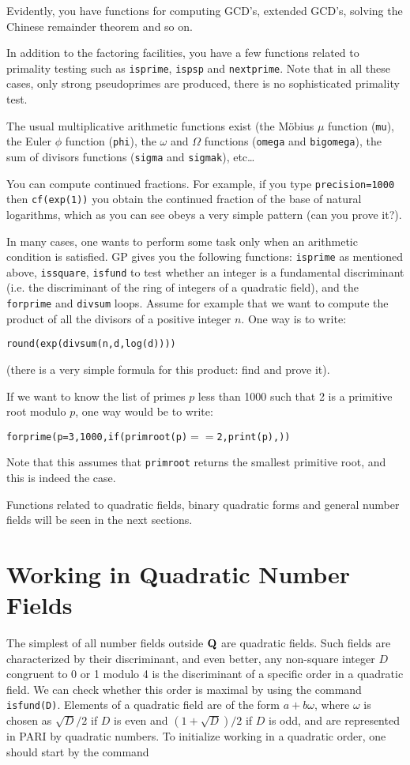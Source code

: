 Evidently, you have functions for computing GCD's, extended GCD's, solving
the Chinese remainder theorem and so on.

In addition to the factoring facilities, you have a few functions related to
primality testing such as {\tt isprime}, {\tt ispsp} and {\tt nextprime}.
Note that in all these cases, only strong pseudoprimes are produced, there
is no sophisticated primality test.

The usual multiplicative arithmetic functions exist (the M\"obius $\mu$ 
function ({\tt mu}), the Euler $\phi$ function ({\tt phi}), the $\omega$
and $\Omega$ functions ({\tt omega} and {\tt bigomega}), the sum of divisors
functions ({\tt sigma} and {\tt sigmak}), etc\dots

You can compute continued fractions. For example, if you type 
{\tt\bs precision=1000} then {\tt cf(exp(1))} you obtain the continued fraction
of the base of natural logarithms, which as you can see obeys a very simple
pattern (can you prove it?).

In many cases, one wants to perform some task only when an arithmetic condition
is satisfied. GP gives you the following functions: {\tt isprime} as mentioned
above, {\tt issquare}, {\tt isfund} to test whether an integer is a fundamental
discriminant (i.e. the discriminant of the ring of integers of a quadratic 
field), and the {\tt forprime} and {\tt divsum} loops. Assume for example that
we want to compute the product of all the divisors of a positive integer $n$.
One way is to write:

\centerline{\tt round(exp(divsum(n,d,log(d))))}

(there is a very simple formula for this product: find and prove it).

If we want to know the list of primes $p$ less than 1000 such that 2 is a
primitive root modulo $p$, one way would be to write:

\centerline{\tt forprime(p=3,1000,if(primroot(p)$==$2,print(p),))}

Note that this assumes that {\tt primroot} returns the smallest primitive root,
and this is indeed the case.

Functions related to quadratic fields, binary quadratic forms and general
number fields will be seen in the next sections.
\medskip
\section{Working in Quadratic Number Fields}
\medskip
The simplest of all number fields outside ${\bf Q}$ are quadratic fields. Such 
fields are characterized by their discriminant, and even better, any non-square
integer $D$ congruent to 0 or 1 modulo 4 is the discriminant of a specific
order in a quadratic field. We can check whether this order is maximal by
using the command {\tt isfund(D)}.
Elements of a quadratic field are of the form $a+b\omega$, where $\omega$ is
chosen as $\sqrt{D}/2$ if $D$ is even and $(1+\sqrt{D})/2$ if $D$ is odd,
and are represented in PARI by quadratic numbers. To initialize working in
a quadratic order, one should start by the command 

